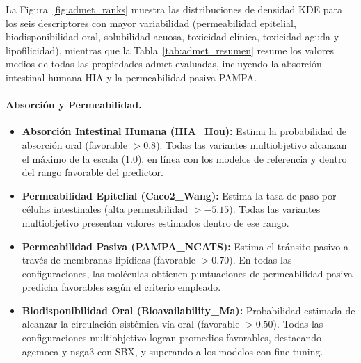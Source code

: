 

La Figura~\ref{fig:admet_ranks} muestra las distribuciones de densidad KDE para los seis descriptores con mayor variabilidad (permeabilidad epitelial, biodisponibilidad oral, solubilidad acuosa, toxicidad clínica, toxicidad aguda y lipofilicidad), mientras que la Tabla~\ref{tab:admet_resumen} resume los valores medios de todas las propiedades \gls{admet} evaluadas, incluyendo la absorción intestinal humana HIA y la permeabilidad pasiva PAMPA.

\paragraph{Absorción y Permeabilidad.}
\begin{itemize}
    \item \textbf{Absorción Intestinal Humana (HIA\_Hou):} Estima la probabilidad de absorción oral (favorable $>0.8$). Todas las variantes multiobjetivo alcanzan el máximo de la escala ($1.0$), en línea con los modelos de referencia y dentro del rango favorable del predictor.
    \item \textbf{Permeabilidad Epitelial (Caco2\_Wang):} Estima la tasa de paso por células intestinales (alta permeabilidad $> -5.15$). Todas las variantes multiobjetivo presentan valores estimados dentro de ese rango.
    \item \textbf{Permeabilidad Pasiva (PAMPA\_NCATS):} Estima el tránsito pasivo a través de membranas lipídicas (favorable $>0.70$). En todas las configuraciones, las moléculas obtienen puntuaciones de permeabilidad pasiva predicha favorables según el criterio empleado.
    \item \textbf{Biodisponibilidad Oral (Bioavailability\_Ma):} Probabilidad estimada de alcanzar la circulación sistémica vía oral (favorable $>0.50$). Todas las configuraciones multiobjetivo logran promedios favorables, destacando \acrshort{agemoea} y \acrshort{nsga3} con SBX, y superando a los modelos con fine-tuning.
\end{itemize}

